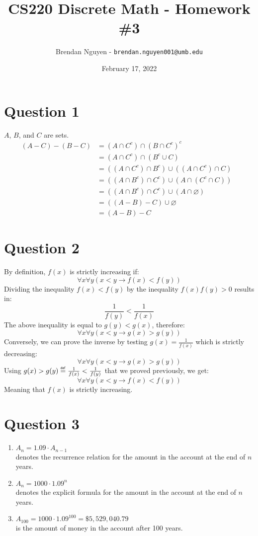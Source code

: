 \documentclass[11pt]{article}
\title{CS220 Discrete Math - Homework \#3}
\author{Brendan Nguyen - \texttt{brendan.nguyen001@umb.edu}}
\date{February 17, 2022}
\begin{document}
\maketitle

\section*{Question 1}
$A$, $B$, and $C$ are sets.
\begin{align*}
    (A - C) - (B - C) & = (A \cap C^c) \cap (B \cap C^c)^c&\\
    & = (A \cap C^c) \cap (B^c \cup C)&\\
    & = ((A \cap C^c) \cap B^c) \cup ((A \cap C^c) \cap C)&\\
    & = ((A \cap B^c) \cap C^c ) \cup (A \cap (C^c \cap C))&\\
    & = ((A \cap B^c) \cap C^c) \cup (A \cap \varnothing)&\\
    & = ((A - B) - C) \cup \varnothing&\\
    & = (A - B) - C
\end{align*}

\section*{Question 2}
\newcommand*{\defeq}{\stackrel{\mathsmaller{\mathsf{def}}}{=}}

By definition, $f(x)$ is strictly increasing if:
\[\forall x \forall y (x < y \to f(x) < f(y))\]
Dividing the inequality $f(x) < f(y)$ by the inequality $f(x)f(y) > 0$ results in:
\[\frac{1}{f(y)} < \frac{1}{f(x)}\]
The above inequality is equal to $g(y) < g(x)$, therefore:
\[\forall x \forall y (x < y \to g(x) > g(y))\]
Conversely, we can prove the inverse by testing $g(x) = \frac{1}{f(x)}$ which is strictly decreasing:
\[\forall x \forall y (x < y \to g(x) > g(y))\]
Using $g(x) > g(y) \defeq \frac{1}{f(x)} < \frac{1}{f(y)}$ that we proved previously, we get:
\[\forall x \forall y (x < y \to f(x) < f(y))\]
Meaning that $f(x)$ is strictly increasing.

\section*{Question 3}
\renewcommand{\labelenumi}{(\alph{enumi})}

\begin{enumerate}
    \item $A_n = 1.09 \cdot A_{n-1}$ \\denotes the recurrence relation for the amount in the account at the end of $n$ years.
    \item $A_n = 1000 \cdot 1.09^n$ \\denotes the explicit formula for the amount in the account at the end of $n$ years.
    \item $A_{100} = 1000 \cdot 1.09^{100} = \$ 5,529,040.79$ \\is the amount of money in the account after 100 years.
\end{enumerate}
\end{document}
